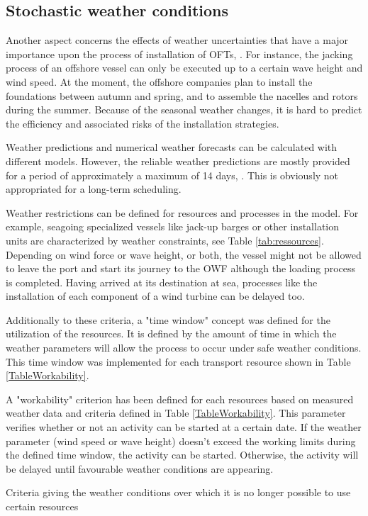 \subsection{Stochastic weather conditions}
Another aspect concerns the effects of weather uncertainties that have a major importance upon the process of installation of OFTs, \cite{COMPIT11}. For instance, the jacking process of an offshore vessel can only be executed up to a certain wave height and wind speed. At the moment, the offshore companies plan to install the foundations between autumn and spring, and to assemble the nacelles and rotors during the summer. Because of the seasonal weather changes, it is hard to predict the efficiency and associated risks of the installation strategies.

Weather predictions and numerical weather forecasts can be calculated with different models. However, the reliable weather predictions are mostly provided for a period of approximately a maximum of 14 days, \cite{hinnenthal2007}. This is obviously not appropriated for a long-term scheduling.

Weather restrictions can be defined for resources and processes in the model. For example, seagoing specialized vessels like jack-up barges or other installation units are characterized by weather constraints, see Table \ref{tab:ressources}. Depending on wind force or wave height, or both, the vessel might not be allowed to leave the port and start its journey to the OWF although the loading process is completed. Having arrived at its destination at sea, processes like the installation of each component of a wind turbine can be delayed too.

Additionally to these criteria, a "time window" concept was defined for the utilization of the resources. It is defined by the amount of time in which the weather parameters will allow the process to occur under safe weather conditions. This time window was implemented for each transport resource shown in Table \ref{TableWorkability}.

A "workability" criterion has been defined for each resources based on measured weather data and criteria defined in Table \ref{TableWorkability}. This parameter verifies whether or not an activity can be started at a certain date. If the weather parameter (wind speed or wave height) doesn't exceed the working limits during the defined time window, the activity can be started. Otherwise, the activity will be delayed until favourable weather conditions are appearing.

\begin{table}[!hbp]
\caption{Criteria giving the weather conditions over which it is no longer possible to use certain resources}
\begin{center}

\end{center}
\label{TableWorkability}
\end{table}

